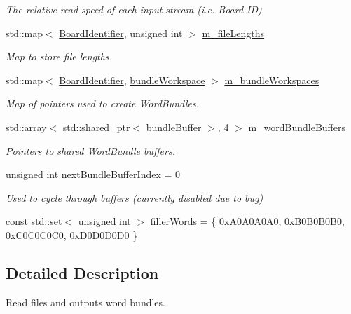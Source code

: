 \begin{DoxyCompactItemize}
\begin{DoxyCompactList}\small\item\em The relative read speed of each input stream (i.\+e. Board ID) \end{DoxyCompactList}\item 
std\+::map$<$ \hyperlink{class_board_identifier}{Board\+Identifier}, unsigned int $>$ \hyperlink{class_file_reader_a983147c8929ee236bfde512c98e7e90d}{m\+\_\+file\+Lengths}
\begin{DoxyCompactList}\small\item\em Map to store file lengths. \end{DoxyCompactList}\item 
std\+::map$<$ \hyperlink{class_board_identifier}{Board\+Identifier}, \hyperlink{class_file_reader_a7fb625dc45cee3256d37cc19c65cad86}{bundle\+Workspace} $>$ \hyperlink{class_file_reader_ac9ec812e6d9fbd7014cf0b4fc69557f9}{m\+\_\+bundle\+Workspaces}
\begin{DoxyCompactList}\small\item\em Map of pointers used to create Word\+Bundles. \end{DoxyCompactList}\item 
std\+::array$<$ std\+::shared\+\_\+ptr$<$ \hyperlink{class_file_reader_ac755c1e271610c2c12a7fc5b55cc048b}{bundle\+Buffer} $>$, 4 $>$ \hyperlink{class_file_reader_a038d1362d7e0458b3450ab8584eab688}{m\+\_\+word\+Bundle\+Buffers}
\begin{DoxyCompactList}\small\item\em Pointers to shared \hyperlink{class_word_bundle}{Word\+Bundle} buffers. \end{DoxyCompactList}\item 
unsigned int \hyperlink{class_file_reader_a44215632cb0ae7ee51991eb3213d03bf}{next\+Bundle\+Buffer\+Index} = 0
\begin{DoxyCompactList}\small\item\em Used to cycle through buffers (currently disabled due to bug) \end{DoxyCompactList}\item 
const std\+::set$<$ unsigned int $>$ \hyperlink{class_file_reader_a7a0bb5e7cb117f6a415f005665893509}{filler\+Words} = \{ 0x\+A0\+A0\+A0\+A0, 0x\+B0\+B0\+B0\+B0, 0x\+C0\+C0\+C0\+C0, 0x\+D0\+D0\+D0\+D0 \}
\end{DoxyCompactItemize}


\subsection{Detailed Description}
Read files and outputs word bundles. 

